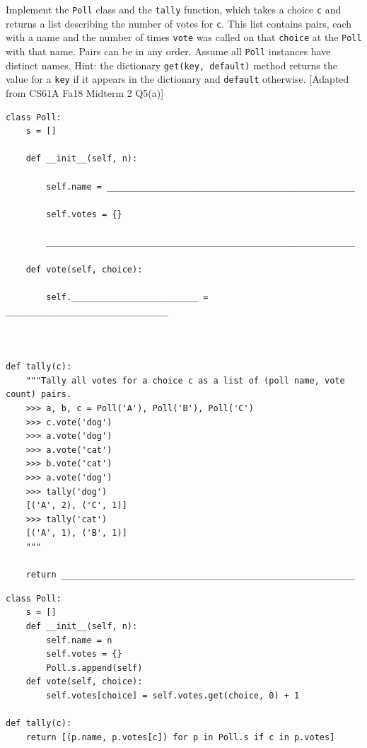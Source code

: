 \begin{blocksection}
    \question {} Implement the \lstinline{Poll} class and the \lstinline{tally} function, which takes a choice \lstinline{c} and returns a list describing the number of votes for \lstinline{c}. 
    This list contains pairs, each with a name and the number of times \lstinline{vote} was called on that \lstinline{choice} at the \lstinline{Poll} with that name. Pairs can be in any order. Assume all \lstinline{Poll}
    instances have distinct names. Hint: the dictionary \lstinline{get(key, default)} method returns the value for a \lstinline{key} if it appears in the dictionary and \lstinline{default} otherwise. [Adapted from CS61A Fa18 Midterm 2 Q5(a)]

    \begin{lstlisting}
class Poll:
    s = []

    def __init__(self, n):

        self.name = _________________________________________________

        self.votes = {}

        _____________________________________________________________

    def vote(self, choice):

        self._________________________ = ________________________________
    


def tally(c):
    """Tally all votes for a choice c as a list of (poll name, vote count) pairs.
    >>> a, b, c = Poll('A'), Poll('B'), Poll('C')
    >>> c.vote('dog')
    >>> a.vote('dog')
    >>> a.vote('cat')
    >>> b.vote('cat')
    >>> a.vote('dog')
    >>> tally('dog')
    [('A', 2), ('C', 1)]
    >>> tally('cat')
    [('A', 1), ('B', 1)]
    """

    return __________________________________________________________
    \end{lstlisting}
\end{blocksection}
\begin{blocksection}
    
    \begin{solution}

    \begin{lstlisting}
class Poll:
    s = []
    def __init__(self, n):
        self.name = n
        self.votes = {}
        Poll.s.append(self)
    def vote(self, choice):
        self.votes[choice] = self.votes.get(choice, 0) + 1

def tally(c):
    return [(p.name, p.votes[c]) for p in Poll.s if c in p.votes]
    \end{lstlisting}
    
    \end{solution}
    \end{blocksection}
